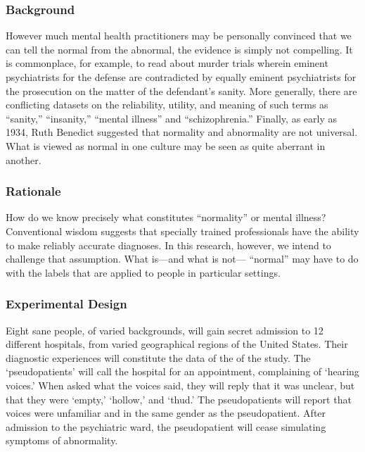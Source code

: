 \begin{refsection}
\subsubsection{Background}
\label{background}

However much mental health practitioners may be personally convinced that we can tell the normal from the abnormal, the evidence is simply not compelling. It is commonplace, for example, to read about murder trials wherein eminent psychiatrists for the defense are contradicted by equally eminent psychiatrists for the prosecution on the matter of the defendant's sanity. More generally, there are conflicting datasets on the reliability, utility, and meaning of such terms as “sanity,” “insanity,” “mental illness” and “schizophrenia.” Finally, as early as 1934, Ruth Benedict suggested that normality and abnormality are not universal. What is viewed as normal in one culture may be seen as quite aberrant in another.

\subsubsection{Rationale}
\label{rationale}

How do we know precisely what constitutes “normality” or mental illness? Conventional wisdom suggests that specially trained professionals have the ability to make reliably accurate diagnoses. In this research, however, we intend to challenge that assumption. What is---and what is not--- “normal” may have to do with the labels that are applied to people in particular settings.

\subsubsection{Experimental Design}
\label{experimentaldesign}

Eight sane people, of varied backgrounds, will gain secret admission to 12 different hospitals, from varied geographical regions of the United States. Their diagnostic experiences will constitute the data of the of the study. The `pseudopatients' will call the hospital for an appointment, complaining of `hearing voices.' When asked what the voices said, they will reply that it was unclear, but that they were `empty,' `hollow,' and `thud.' The pseudopatients will report that voices were unfamiliar and in the same gender as the pseudopatient. After admission to the psychiatric ward, the pseudopatient will cease simulating symptoms of abnormality. 


\end{refsection}
